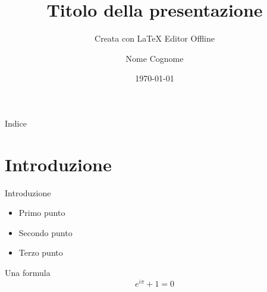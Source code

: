 \documentclass{beamer}
\title{Titolo della presentazione}
\subtitle{Creata con LaTeX Editor Offline}
\author{Nome Cognome}
\date{\today}
\begin{document}
\frame{\titlepage}

\begin{frame}{Indice}
  \tableofcontents
\end{frame}

\section{Introduzione}
\begin{frame}{Introduzione}
  \begin{itemize}
    \item Primo punto
    \item Secondo punto
    \item Terzo punto
  \end{itemize}
\end{frame}

\begin{frame}{Una formula}
  \begin{equation}
    e^{i\pi} + 1 = 0
  \end{equation}
\end{frame}
\end{document}
